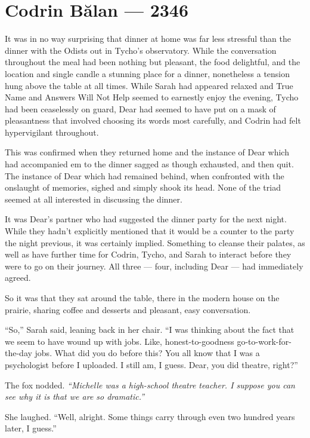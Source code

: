 \hypertarget{codrin-bux103lan-2346}{%
\chapter{Codrin Bălan — 2346}\label{codrin-bux103lan-2346}}

It was in no way surprising that dinner at home was far less stressful than the dinner with the Odists out in Tycho's observatory. While the conversation throughout the meal had been nothing but pleasant, the food delightful, and the location and single candle a stunning place for a dinner, nonetheless a tension hung above the table at all times. While Sarah had appeared relaxed and True Name and Answers Will Not Help seemed to earnestly enjoy the evening, Tycho had been ceaselessly on guard, Dear had seemed to have put on a mask of pleasantness that involved choosing its words most carefully, and Codrin had felt hypervigilant throughout.

This was confirmed when they returned home and the instance of Dear which had accompanied em to the dinner sagged as though exhausted, and then quit. The instance of Dear which had remained behind, when confronted with the onslaught of memories, sighed and simply shook its head. None of the triad seemed at all interested in discussing the dinner.

It was Dear's partner who had suggested the dinner party for the next night. While they hadn't explicitly mentioned that it would be a counter to the party the night previous, it was certainly implied. Something to cleanse their palates, as well as have further time for Codrin, Tycho, and Sarah to interact before they were to go on their journey. All three — four, including Dear — had immediately agreed.

So it was that they sat around the table, there in the modern house on the prairie, sharing coffee and desserts and pleasant, easy conversation.

``So,'' Sarah said, leaning back in her chair. ``I was thinking about the fact that we seem to have wound up with jobs. Like, honest-to-goodness go-to-work-for-the-day jobs. What did you do before this? You all know that I was a psychologist before I uploaded. I still am, I guess. Dear, you did theatre, right?''

The fox nodded. \emph{``Michelle was a high-school theatre teacher. I suppose you can see why it is that we are so dramatic.''}

She laughed. ``Well, alright. Some things carry through even two hundred years later, I guess.''

